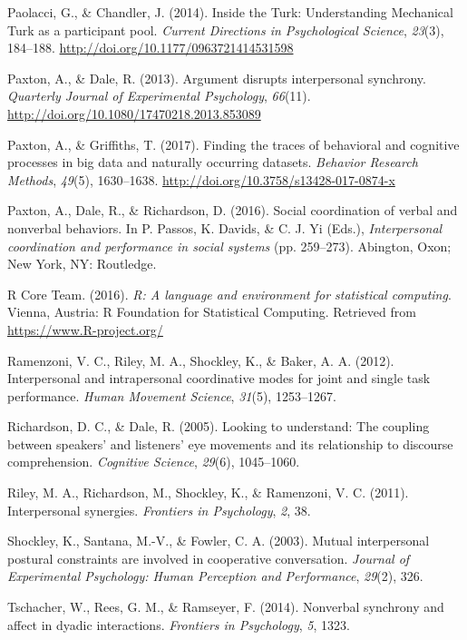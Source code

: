 \documentclass[10pt, letterpaper]{article}
\begin{document}
\hypertarget{ref-paolacci2014inside}{}
Paolacci, G., \& Chandler, J. (2014). Inside the Turk: Understanding
Mechanical Turk as a participant pool. \emph{Current Directions in
Psychological Science}, \emph{23}(3), 184--188.
\url{http://doi.org/10.1177/0963721414531598}

\hypertarget{ref-paxton2013argument}{}
Paxton, A., \& Dale, R. (2013). Argument disrupts interpersonal
synchrony. \emph{Quarterly Journal of Experimental Psychology},
\emph{66}(11). \url{http://doi.org/10.1080/17470218.2013.853089}

\hypertarget{ref-paxton2017finding}{}
Paxton, A., \& Griffiths, T. (2017). Finding the traces of behavioral
and cognitive processes in big data and naturally occurring datasets.
\emph{Behavior Research Methods}, \emph{49}(5), 1630--1638.
\url{http://doi.org/10.3758/s13428-017-0874-x}

\hypertarget{ref-paxton2016social}{}
Paxton, A., Dale, R., \& Richardson, D. (2016). Social coordination of
verbal and nonverbal behaviors. In P. Passos, K. Davids, \& C. J. Yi
(Eds.), \emph{Interpersonal coordination and performance in social
systems} (pp. 259--273). Abington, Oxon; New York, NY: Routledge.

\hypertarget{ref-r2016r}{}
R Core Team. (2016). \emph{R: A language and environment for statistical
computing}. Vienna, Austria: R Foundation for Statistical Computing.
Retrieved from \url{https://www.R-project.org/}

\hypertarget{ref-ramenzoni2012interpersonal}{}
Ramenzoni, V. C., Riley, M. A., Shockley, K., \& Baker, A. A. (2012).
Interpersonal and intrapersonal coordinative modes for joint and single
task performance. \emph{Human Movement Science}, \emph{31}(5),
1253--1267.

\hypertarget{ref-richardson2005looking}{}
Richardson, D. C., \& Dale, R. (2005). Looking to understand: The
coupling between speakers' and listeners' eye movements and its
relationship to discourse comprehension. \emph{Cognitive Science},
\emph{29}(6), 1045--1060.

\hypertarget{ref-riley2011interpersonal}{}
Riley, M. A., Richardson, M., Shockley, K., \& Ramenzoni, V. C. (2011).
Interpersonal synergies. \emph{Frontiers in Psychology}, \emph{2}, 38.

\hypertarget{ref-shockley2003mutual}{}
Shockley, K., Santana, M.-V., \& Fowler, C. A. (2003). Mutual
interpersonal postural constraints are involved in cooperative
conversation. \emph{Journal of Experimental Psychology: Human Perception
and Performance}, \emph{29}(2), 326.

\hypertarget{ref-tschacher2014nonverbal}{}
Tschacher, W., Rees, G. M., \& Ramseyer, F. (2014). Nonverbal synchrony
and affect in dyadic interactions. \emph{Frontiers in Psychology},
\emph{5}, 1323.
\end{document}
